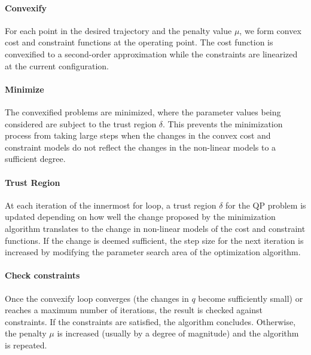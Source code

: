 \documentclass[times, utf8, diplomski, english]{fer}
\begin{document}
\paragraph*{Convexify}
For each point in the desired trajectory and the penalty value $\mu$, we form convex cost and constraint functions at the operating point.
The cost function is convexified to a second-order approximation while the constraints are linearized at the current configuration.
\paragraph*{Minimize}
The convexified problems are minimized, where the parameter values being considered are subject to the trust region $\delta$.
This prevents the minimization process from taking large steps when the changes in the convex cost and constraint models do not reflect the changes in the non-linear models to a sufficient degree.
\paragraph*{Trust Region}
At each iteration of the innermost for loop, a trust region $\delta$ for the QP problem is updated depending on how well the change proposed by the minimization algorithm translates to the change in non-linear models of the cost and constraint functions.
If the change is deemed sufficient, the step size for the next iteration is increased by modifying the parameter search area of the optimization algorithm.
\paragraph*{Check constraints} 
Once the convexify loop converges (the changes in $q$ become sufficiently small) or reaches a maximum number of iterations, the result is checked against constraints.
If the constraints are satisfied, the algorithm concludes.
Otherwise, the penalty $\mu$ is increased (usually by a degree of magnitude) and the algorithm is repeated.
\end{document}

